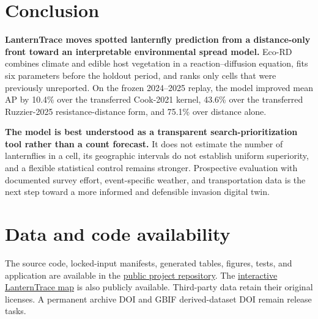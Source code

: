 \documentclass{article}
\begin{document}
\section{Conclusion}

\textbf{LanternTrace moves spotted lanternfly prediction from a distance-only front toward an interpretable environmental spread model.} Eco-RD combines climate and edible host vegetation in a reaction--diffusion equation, fits six parameters before the holdout period, and ranks only cells that were previously unreported. On the frozen 2024--2025 replay, the model improved mean AP by 10.4\% over the transferred Cook-2021 kernel, 43.6\% over the transferred Ruzzier-2025 resistance-distance form, and 75.1\% over distance alone.

\textbf{The model is best understood as a transparent search-prioritization tool rather than a count forecast.} It does not estimate the number of lanternflies in a cell, its geographic intervals do not establish uniform superiority, and a flexible statistical control remains stronger. Prospective evaluation with documented survey effort, event-specific weather, and transportation data is the next step toward a more informed and defensible invasion digital twin.

\section*{Data and code availability}

The source code, locked-input manifests, generated tables, figures, tests, and application are available in the \href{https://github.com/axel-slid/lanterntrace-explorer}{public project repository}. The \href{https://www.alex-dils.com/lanterntrace/app/}{interactive LanternTrace map} is also publicly available. Third-party data retain their original licenses. A permanent archive DOI and GBIF derived-dataset DOI remain release tasks.
\end{document}
